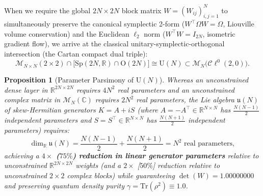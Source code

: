 \documentclass[11pt,a4paper]{article}
\newtheorem{proposition}[theorem]{Proposition}
\begin{document}
When we require the global $2N\times 2N$ block matrix $W = (W_{ij})_{i,j=1}^N$ to simultaneously preserve the canonical symplectic 2-form ($W^\top \Omega W = \Omega$, Liouville volume conservation) and the Euclidean $\ell_2$ norm ($W^\top W = I_{2N}$, isometric gradient flow), we arrive at the classical unitary-symplectic-orthogonal intersection (the Cartan compact dual triple):
\begin{equation}
    \mathcal{M}_{N\times N}(2\times 2) \cap \Big[\mathrm{Sp}(2N, \mathbb{R}) \cap \mathrm{O}(2N)\Big] \cong \mathrm{U}(N) \subset \mathcal{M}_N\big(\mathcal{C}\ell^0(2,0)\big).
    \label{eq:cartan_triple_intersection}
\end{equation}

\begin{proposition}[Parameter Parsimony of $\mathrm{U}(N)$]
\label{prop:unitary_parsimony}
Whereas an unconstrained dense layer in $\mathbb{R}^{2N\times 2N}$ requires $4N^2$ real parameters and an unconstrained complex matrix in $\mathcal{M}_N(\mathbb{C})$ requires $2N^2$ real parameters, the Lie algebra $\mathfrak{u}(N)$ of skew-Hermitian generators $K = A + i S$ (where $A = -A^\top \in \mathbb{R}^{N\times N}$ has $\frac{N(N-1)}{2}$ independent parameters and $S = S^\top \in \mathbb{R}^{N\times N}$ has $\frac{N(N+1)}{2}$ independent parameters) requires:
\begin{equation}
    \dim_{\mathbb{R}} \mathfrak{u}(N) = \frac{N(N-1)}{2} + \frac{N(N+1)}{2} = N^2 \text{ real parameters},
\end{equation}
achieving a \textbf{$4\times$ ($75\%$) reduction in linear generator parameters} relative to unconstrained $\mathbb{R}^{2N\times 2N}$ weights (and a $2\times$ [$50\%$] reduction relative to unconstrained $2\times 2$ complex blocks) while guaranteeing $\det(W) = 1.00000000$ and preserving quantum density purity $\gamma = \mathrm{Tr}(\rho^2) \equiv 1.0$.
\end{proposition}
\end{document}

